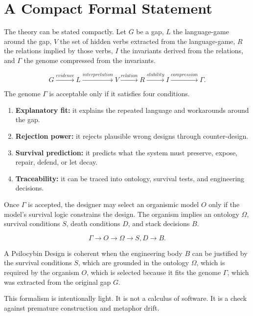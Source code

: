 \documentclass[11pt]{article}
\begin{document}
\section{A Compact Formal Statement}

The theory can be stated compactly. Let \(G\) be a gap, \(L\) the language-game around the gap, \(V\) the set of hidden verbs extracted from the language-game, \(R\) the relations implied by those verbs, \(I\) the invariants derived from the relations, and \(\Gamma\) the genome compressed from the invariants.

\[
    G \xrightarrow{evidence} L \xrightarrow{interpretation} V \xrightarrow{relation} R \xrightarrow{stability} I \xrightarrow{compression} \Gamma.
\]

The genome \(\Gamma\) is acceptable only if it satisfies four conditions.

\begin{enumerate}[leftmargin=*]
    \item \textbf{Explanatory fit:} it explains the repeated language and workarounds around the gap.
    \item \textbf{Rejection power:} it rejects plausible wrong designs through counter-design.
    \item \textbf{Survival prediction:} it predicts what the system must preserve, expose, repair, defend, or let decay.
    \item \textbf{Traceability:} it can be traced into ontology, survival tests, and engineering decisions.
\end{enumerate}

Once \(\Gamma\) is accepted, the designer may select an organismic model \(O\) only if the model's survival logic constrains the design. The organism implies an ontology \(\Omega\), survival conditions \(S\), death conditions \(D\), and stack decisions \(B\).

\[
    \Gamma \rightarrow O \rightarrow \Omega \rightarrow S,D \rightarrow B.
\]

A Psilocybin Design is coherent when the engineering body \(B\) can be justified by the survival conditions \(S\), which are grounded in the ontology \(\Omega\), which is required by the organism \(O\), which is selected because it fits the genome \(\Gamma\), which was extracted from the original gap \(G\).

This formalism is intentionally light. It is not a calculus of software. It is a check against premature construction and metaphor drift.
\end{document}

